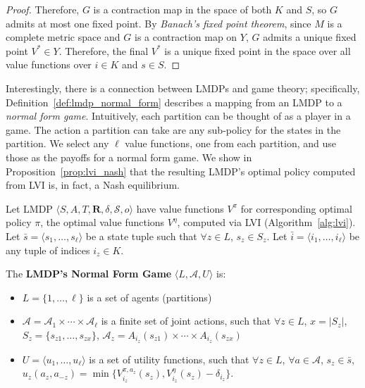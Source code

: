 \begin{proof}
Therefore, $G$ is a contraction map in the space of both $K$ and $S$, so $G$ admits at most one fixed point. By \emph{Banach's fixed point theorem}, since $M$ is a complete metric space and $G$ is a contraction map on $Y$, $G$ admits a unique fixed point $V^* \in Y$. Therefore, the final $V^*$ is a unique fixed point in the space over all value functions over $i \in K$ and $s \in S$.
\end{proof}

Interestingly, there is a connection between LMDPs and game theory; specifically, Definition~\ref{def:lmdp_normal_form} describes a mapping from an LMDP to a \emph{normal form game}. Intuitively, each partition can be thought of as a player in a game. The action a partition can take are any sub-policy for the states in the partition. We select any $\ell$ value functions, one from each partition, and use those as the payoffs for a normal form game. We show in Proposition~\ref{prop:lvi_nash} that the resulting LMDP's optimal policy computed from LVI is, in fact, a Nash equilibrium.


\begin{definition}
    \label{def:lmdp_normal_form}
    Let LMDP $\langle S, A, T, \mathbf{R}, \delta, \mathcal{S}, o \rangle$ have value functions $V^\pi$ for corresponding optimal policy $\pi$, the optimal value functions $V^\eta$, computed via LVI (Algorithm~\ref{alg:lvi}). Let $\bar{s} = \langle s_1, \ldots, s_\ell \rangle$ be a state tuple such that $\forall z \in L$, $s_z \in S_z$. Let $\bar{i} = \langle i_1, \ldots, i_\ell \rangle$ be any tuple of indices $i_z \in K$.

    The \textbf{LMDP's Normal Form Game} $\langle L, \mathcal{A}, U \rangle$ is:
    \begin{itemize}
        \item $L = \{1, \ldots, \ell\}$ is a set of agents (partitions)
        \item $\mathcal{A} = \mathcal{A}_1 \times \cdots \times \mathcal{A}_\ell$ is a finite set of joint actions, such that $\forall z \in L$, $x = |S_z|$, $S_z = \{s_{z1}, \ldots, s_{zx}\}$, $\mathcal{A}_z = A_{i_z}(s_{z1}) \times \cdots \times A_{i_z}(s_{zx})$
        \item $U = \langle u_1, \ldots, u_\ell \rangle$ is a set of utility functions, such that $\forall z \in L$, $\forall a \in \mathcal{A}$, $s_z \in \bar{s}$, $u_z(a_z, a_{-z}) = \min \{ V_{i_z}^{\pi, a_z} (s_z), V_{i_z}^\eta (s_z) - \delta_{i_z} \}$.
    \end{itemize}
\end{definition}

